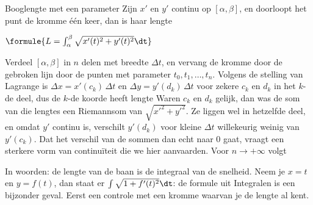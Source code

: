 
\begin{theorie}
\begin{stelling}{Booglengte met een parameter}
Zijn $x'$ en $y'$ continu op $[\alpha, \beta]$, en doorloopt het punt de kromme één keer, dan is haar lengte

\vspace{1mm}
\qquad $\formule{L = \int_\alpha^\beta \sqrt{x'(t)^2 + y'(t)^2}\dt}$
\end{stelling}

\begin{bewijs}
Verdeel $[\alpha, \beta]$ in $n$ delen met breedte $\Delta t$, en vervang de kromme door de gebroken lijn door de punten met parameter $t_0, t_1, \ldots, t_n$. Volgens de stelling van Lagrange is $\Delta x = x'(c_k)\,\Delta t$ en $\Delta y = y'(d_k)\,\Delta t$ voor zekere $c_k$ en $d_k$ in het $k$-de deel, dus de $k$-de koorde heeft lengte
Waren $c_k$ en $d_k$ gelijk, dan was de som van die lengtes een Riemannsom van $\sqrt{x'^2 + y'^2}$. Ze liggen wel in hetzelfde deel, en omdat $y'$ continu is, verschilt $y'(d_k)$ voor kleine $\Delta t$ willekeurig weinig van $y'(c_k)$. Dat het verschil van de sommen dan echt naar 0 gaat, vraagt een sterkere vorm van continuïteit die we hier aanvaarden. Voor $n \to +\infty$ volgt
\end{bewijs}
\end{theorie}

In woorden: de lengte van de baan is de integraal van de snelheid. Neem je $x = t$ en $y = f(t)$, dan staat er $\int \sqrt{1 + f'(t)^2}\dt$: de formule uit Integralen is een bijzonder geval. Eerst een controle met een kromme waarvan je de lengte al kent.


